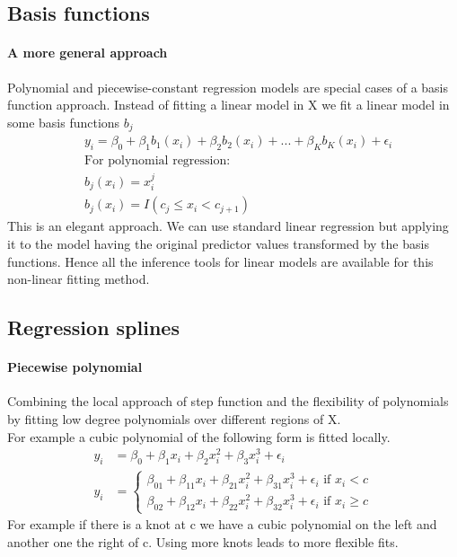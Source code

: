 \documentclass[../document.tex]{subfiles}
\begin{document}
	\subsection{Basis functions}

	\paragraph{A more general approach}
	Polynomial and piecewise-constant regression models are special cases of a basis function approach. Instead of fitting a linear model in X we fit a linear model in some basis functions \(b_{j}\)
	\begin{equation}
	\begin{split}
		&y_{i}=\beta_{0}+\beta_{1}b_{1}(x_{i})+\beta_{2}b_{2}(x_{i})+...+\beta_{K}b_{K}(x_{i})+\epsilon_{i}\\
		&\text{For polynomial regression:}\\
		&b_{j}(x_{i})=x_{i}^j\\
		&b_{j}(x_{i})=I(c_{j}\leq x_{i} < c_{j+1})
	\end{split}
	\end{equation}
	This is an elegant approach. We can use standard linear regression but applying it to the model having the original predictor values transformed by the basis functions. Hence all the inference tools for linear models are available for this non-linear fitting method.

	\subsection{Regression splines}

	\paragraph{Piecewise polynomial}
	Combining the local approach of step function and the flexibility of polynomials by fitting low degree polynomials over different regions of X.\\
	For example a cubic polynomial of the following form is fitted locally.
	\begin{equation}
	\begin{split}
		y_{i}&=\beta_{0}+\beta_{1}x_{i}+\beta_{2}x_{i}^2+\beta_{3}x_{i}^3+\epsilon_{i}\\
		y_{i}&=\begin{cases}
			\beta_{01}+\beta_{11}x_{i}+\beta_{21}x_{i}^2+\beta_{31}x_{i}^3+\epsilon_{i} \text{  if  } x_{i} < c\\
			\beta_{02}+\beta_{12}x_{i}+\beta_{22}x_{i}^2+\beta_{32}x_{i}^3+\epsilon_{i} \text{  if  } x_{i} \geq c
		\end{cases}
	\end{split}
	\end{equation}
	For example if there is a knot at c we have a cubic polynomial on the left and another one the right of c. Using more knots leads to more flexible fits.
\end{document}
